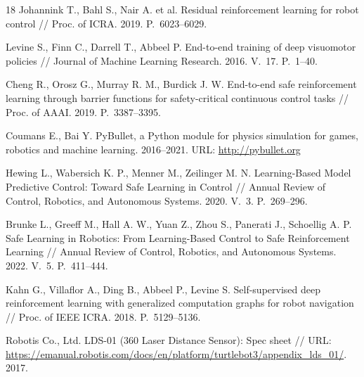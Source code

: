 \documentclass[11pt]{article}
\begin{document}
{\begin{thebibliography}{18}
Johannink T., Bahl S., Nair A. et al. Residual reinforcement learning for robot control
// Proc. of ICRA. 2019. P.~6023--6029.

Levine S., Finn C., Darrell T., Abbeel P. End-to-end training of deep visuomotor policies
// Journal of Machine Learning Research. 2016. V.~17. P.~1--40.

Cheng R., Orosz G., Murray R. M., Burdick J. W. End-to-end safe reinforcement learning through barrier functions for safety-critical continuous control tasks
// Proc. of AAAI. 2019. P.~3387--3395.

Coumans E., Bai Y. PyBullet, a Python module for physics simulation for games, robotics and machine learning. 2016--2021. URL: \url{http://pybullet.org}

Hewing L., Wabersich K. P., Menner M., Zeilinger M. N. Learning-Based Model Predictive Control: Toward Safe Learning in Control // Annual Review of Control, Robotics, and Autonomous Systems. 2020. V.~3. P.~269--296.

Brunke L., Greeff M., Hall A. W., Yuan Z., Zhou S., Panerati J., Schoellig A. P. Safe Learning in Robotics: From Learning-Based Control to Safe Reinforcement Learning // Annual Review of Control, Robotics, and Autonomous Systems. 2022. V.~5. P.~411--444.

Kahn G., Villaflor A., Ding B., Abbeel P., Levine S. Self-supervised deep reinforcement learning with generalized computation graphs for robot navigation // Proc. of IEEE ICRA. 2018. P.~5129--5136.

Robotis Co., Ltd. LDS-01 (360 Laser Distance Sensor): Spec sheet // URL: \url{https://emanual.robotis.com/docs/en/platform/turtlebot3/appendix_lds_01/}. 2017.

\end{thebibliography}}
\end{document}
